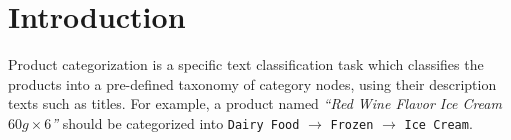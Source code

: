 \section{Introduction}

Product categorization \cite{ding2002goldenbullet} is a specific text classification task which classifies the products into a pre-defined taxonomy of category nodes, using their description texts such as titles. 
For example, a product named \textit{``Red Wine Flavor Ice Cream $60g \times 6$''} should be categorized into 
\verb|Dairy Food| $\rightarrow$ \verb|Frozen| $\rightarrow$ \verb|Ice Cream|.

